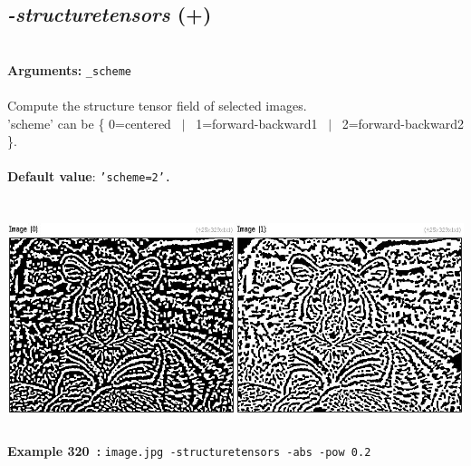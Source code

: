 \documentclass[a4paper,11pt,twoside]{book}
\begin{document}
\subsection{\emph{-structuretensors} (+)}\vspace*{-0.5em}
~\\\textbf{Arguments: } 
{\small \texttt{\_scheme}}\\~\\
Compute the structure tensor field of selected images.
~\\'scheme' can be \{ 0=centered ~$|$~ 1=forward-backward1 ~$|$~ 2=forward-backward2 \}.
~\\~\\\textbf{Default value}: {\small \texttt{'scheme=2'.}}
\begin{center}\includegraphics[keepaspectratio=true,height=7cm,width=\textwidth]{img/gmic_def320.jpg}\\
{\footnotesize \textbf{Example 320~:} \texttt{image.jpg -structuretensors -abs -pow 0.2}}
\end{center}
\end{document}

